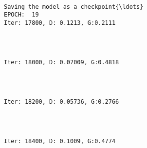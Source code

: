 \documentclass[11pt]{article}
\begin{document}
    \begin{Verbatim}[commandchars=\\\{\}]

Saving the model as a checkpoint{\ldots}
EPOCH:  19
Iter: 17800, D: 0.1213, G:0.2111
    \end{Verbatim}

    \begin{center}
    \end{center}
    { \hspace*{\fill} \\}
    
    \begin{Verbatim}[commandchars=\\\{\}]

Iter: 18000, D: 0.07009, G:0.4818
    \end{Verbatim}

    \begin{center}
    \end{center}
    { \hspace*{\fill} \\}
    
    \begin{Verbatim}[commandchars=\\\{\}]

Iter: 18200, D: 0.05736, G:0.2766
    \end{Verbatim}

    \begin{center}
    \end{center}
    { \hspace*{\fill} \\}
    
    \begin{Verbatim}[commandchars=\\\{\}]

Iter: 18400, D: 0.1009, G:0.4774
    \end{Verbatim}

    \begin{center}
    \end{center}
    { \hspace*{\fill} \\}
    
\end{document}
